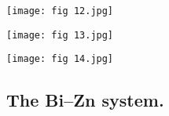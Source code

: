 \documentclass[12pt]{article}
\newcommand*{\1}{\hspace{1pt}}
\begin{document}
    \begin{adjustbox}{center,caption={Calculated phase diagram (continuous curve) using the coefficient set given in
        table 4.},label={somelabel},nofloat=figure,vspace=\bigskipamount}
        \texttt{[image: fig 12.jpg]}
    \end{adjustbox}
    \begin{adjustbox}{center,caption={Calculated (continuous curve) enthalpy of mixing at different temperatures (1, 609 K;
        2, 656 K; 3,695 K) using the coefficient set given in table 4.},label={somelabel},nofloat=figure,vspace=\bigskipamount}
        \texttt{[image: fig 13.jpg]}
    \end{adjustbox}
    \begin{adjustbox}{center,caption={Calculated (continuous curve) activities at 742 K using the coefficient set given in
        table 4.},label={somelabel},nofloat=figure,vspace=\bigskipamount}
        \texttt{[image: fig 14.jpg]}
    \end{adjustbox}

    \subsection{ The Bi–Zn system.}
\end{document}
